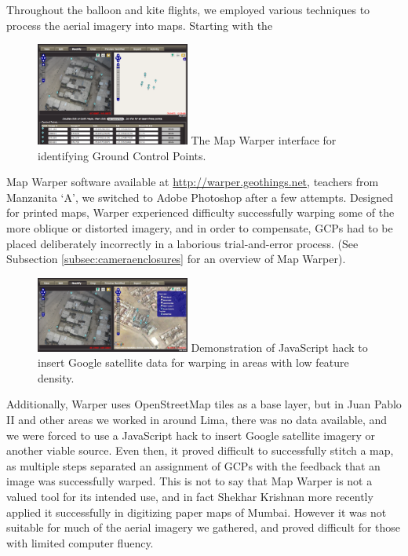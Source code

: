 \documentclass[11pt]{report}
\begin{document}
Throughout the balloon and kite flights, we employed various techniques to process the aerial imagery into maps. Starting with the \begin{figure}
	\begin{flushright}
		\includegraphics[width=0.45\textwidth]{images/map-warper.png}
		The Map Warper interface for identifying Ground Control Points. \cite{waters2009warper}
	\end{flushright}
\end{figure} Map Warper software available at \url{http://warper.geothings.net}, teachers from Manzanita `A', we switched to Adobe Photoshop after a few attempts. Designed for printed maps, Warper experienced difficulty successfully warping some of the more oblique or distorted imagery, and in order to compensate, GCPs had to be placed deliberately incorrectly in a laborious trial-and-error process. (See Subsection \ref{subsec:cameraenclosures} for an overview of Map Warper). \begin{figure}
	\begin{flushright}
		\includegraphics[width=0.45\textwidth]{images/map-warper-hack.png}
		Demonstration of JavaScript hack to insert Google satellite data for warping in areas with low feature density. \cite{waters2009warper}
	\end{flushright}
\end{figure}Additionally, Warper uses OpenStreetMap tiles as a base layer, but in Juan Pablo II and other areas we worked in around Lima, there was no data available, and we were forced to use a JavaScript hack to insert Google satellite imagery or another viable source. Even then, it proved difficult to successfully stitch a map, as multiple steps separated an assignment of GCPs with the feedback that an image was successfully warped. This is not to say that Map Warper is not a valued tool for its intended use, and in fact Shekhar Krishnan more recently applied it successfully in digitizing paper maps of Mumbai. However it was not suitable for much of the aerial imagery we gathered, and proved difficult for those with limited computer fluency.
\end{document}
